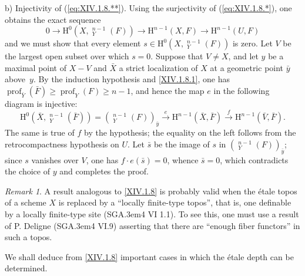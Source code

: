 \documentclass[11pt,a4paper,oneside]{book}
\providecommand{\sisi}[2]{#2}
\providecommand{\pageoriginale}{%
  \refstepcounter{pageoriginal}%
  \marginpar{\raggedright\footnotesize\bfseries\thepageoriginal}%
  \xspace}
\providecommand{\og}{``}
\providecommand{\fg}{''\xspace}
\providecommand{\SGA}{\textup{SGA}\kern.3em}
\providecommand{\h}{\mathop{\underline{H}}\nolimits}
\providecommand{\prof}{\operatorname{prof}}
\renewcommand{\H}{\mathrm H}
\providecommand{\lto}[1]{\xrightarrow{#1}}
\theoremstyle{plain}
\theoremstyle{definition}
\theoremstyle{remark}
\newtheorem{remarque}[subsection]{Remark}
\renewcommand{\Ref}[1]{\textup{\ref{#1}}}
\begin{document}
b) Injectivity of (\Ref{eq:XIV.1.8.**}). Using the surjectivity of (\Ref{eq:XIV.1.8.*}), one obtains the exact sequence
$$0\to \H^0(X, {\h}_Y^{n-1}(F))\to \H^{n-1}(X, F)\to \H^{n-1}(U, F)$$
and we must show that every element $s\in \H^0(X, {\h}_Y^{n-1}(F))$ is zero. Let $V$\pageoriginale be the largest open subset over which $s=0$. Suppose that $V\neq X$, and let $y$ be a maximal point of $X-V$ and $\bar X$ a strict localization of $X$ at a geometric point $\bar y$ above~$y$. By the induction hypothesis and \Ref{XIV.1.8.1}, one has $\prof_{\bar Y}(\bar F)\geq \prof_Y(F)\geq n-1$, and hence the map $e$ in the following diagram is injective:
$$
\H^0(\bar X, {\h}_Y^{n-1}(\bar F))= ({\h}_Y^{n-1}(F))_{\bar y}\lto{e} \H^{n-1}(\bar X, \bar F) \lto{f} \H^{n-1}(\bar V, \bar F).
$$
The same is true of $f$ by the hypothesis; the equality on the left follows from the retrocompactness hypothesis on $U$. Let $\bar s$ be the image of $s$ in $({\h}_Y^{n-1}(F))_{\bar y}$; since $s$ vanishes over $V$, one has $f\cdot e(\bar s)=0$, whence $\bar s=0$, which contradicts the choice of $y$ and completes the proof.

\begin{remarque} \label{XIV.1.9}
A result analogous to \Ref{XIV.1.8} is probably valid when the étale topos of a scheme $X$ is replaced by a \og locally finite-type topos\fg, that is, one definable by a locally finite-type site (\SGA 4 VI 1.1). To see this, one must use a result of P. Deligne (\SGA \sisi{4 XVII}{4 VI.9}) asserting that there are \og enough fiber functors\fg in such a topos.
\end{remarque}

We shall deduce from \Ref{XIV.1.8} important cases in which the étale depth can be determined.
\end{document}
